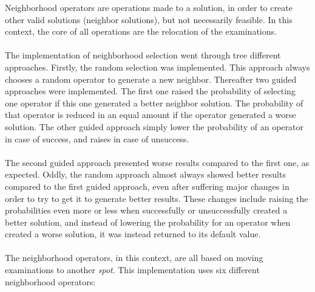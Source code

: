 Neighborhood operators are operations made to a solution, in order to create other valid solutions (neighbor solutions), but not necessarily feasible. In this context, the core of all operations are the relocation of the examinations.\\
\\
The implementation of neighborhood selection went through tree different approaches. Firstly, the random selection was implemented. This approach always chooses a random operator to generate a new neighbor. Thereafter two guided approaches were implemented. The first one raised the probability of selecting one operator if this one generated a better neighbor solution. The probability of that operator is reduced in an equal amount if the operator generated a worse solution. The other guided approach simply lower the probability of an operator in case of success, and raises in case of unsuccess. \\
\\
The second guided approach presented worse results compared to the first one, as expected. Oddly, the random approach almost always showed better results compared to the first guided approach, even after suffering major changes in order to try to get it to generate better results. These changes include raising the probabilities even more or less when successfully or unsuccessfully created a better solution, and instead of lowering the probability for an operator when created a worse solution, it was instead returned to its default value.\\
\\
The neighborhood operators, in this context, are all based on moving examinations to another \textit{spot}. This implementation uses six different neighborhood operators:
\\

